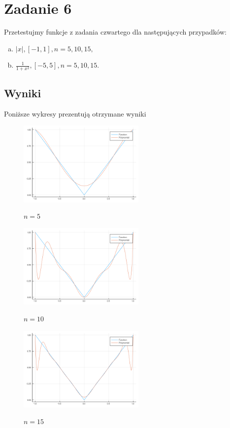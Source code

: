 \documentclass[12pt]{article}
\begin{document}
\section{Zadanie 6}
Przetestujmy funkcje z zadania czwartego dla następujących przypadków:
\begin{enumerate}[a)]
\item $|x|, [-1, 1], n=5, 10, 15,$
\item $\frac{1}{1+x^2}, [-5, 5], n=5, 10, 15$.
\end{enumerate}

\subsection{Wyniki}
Poniższe wykresy prezentują otrzymane wyniki
	\begin{figure}[!htbp]
		\centering
		{\includegraphics[width=0.55\textwidth]{7.png}}
		\caption{$n=5$}
	\end{figure}	
	\begin{figure}[!htbp]
		\centering
		{\includegraphics[width=0.55\textwidth]{8.png}}
		\caption{$n=10$}
	\end{figure}		
	\begin{figure}[!htbp]
		\centering
		{\includegraphics[width=0.55\textwidth]{9.png}}
		\caption{$n=15$}
	\end{figure}
	
\end{document}

